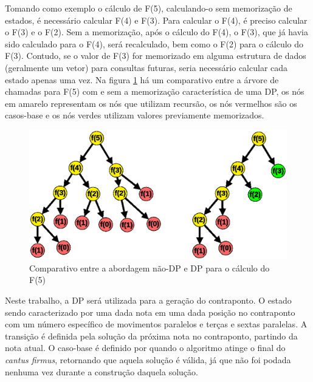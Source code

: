       Tomando como exemplo o cálculo de F(5), calculando-o sem memorização de estados, é necessário calcular F(4) e F(3). Para calcular o F(4), é preciso calcular o F(3) e o F(2). Sem a memorização, após o cálculo do F(4), o F(3), que já havia sido calculado para o F(4), será recalculado, bem como o F(2) para o cálculo do F(3). Contudo, se o valor de F(3) for memorizado em alguma estrutura de dados (geralmente um vetor) para consultas futuras, seria necessário calcular cada estado apenas uma vez. Na figura \ref{nodpxdp} há um comparativo entre a árvore de chamadas para F(5) com e sem a memorização característica de uma DP, os nós em amarelo representam os nós que utilizam recursão, os nós vermelhos são os casos-base e os nós verdes utilizam valores previamente memorizados.

      \begin{figure}[htb]
        \centering
        \includegraphics[scale=0.5]{figuras/nodpxdp.eps}
        \caption{Comparativo entre a abordagem não-DP e DP para o cálculo do F(5)}
        \label{nodpxdp}
      \end{figure}

      Neste trabalho, a DP será utilizada para a geração do contraponto. O estado sendo caracterizado por uma dada nota em uma dada posição no contraponto com um número específico de movimentos paralelos e terças e sextas paralelas. A transição é definida pela solução da próxima nota no contraponto, partindo da nota atual. O caso-base é definido por quando o algoritmo atinge o final do \textit{cantus firmus}, retornando que aquela solução é válida, já que não foi podada nenhuma vez durante a construção daquela solução.
